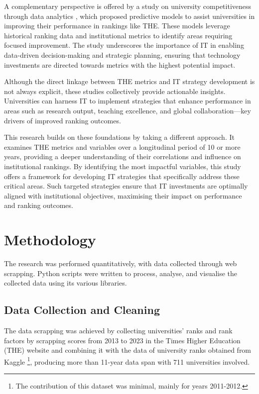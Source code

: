 \documentclass[sigconf]{acmart}
\begin{document}
A complementary perspective is offered by a study on university competitiveness through data analytics \cite{analytics2022competitiveness}, which proposed predictive models to assist universities in improving their performance in rankings like THE. These models leverage historical ranking data and institutional metrics to identify areas requiring focused improvement. The study underscores the importance of IT in enabling data-driven decision-making and strategic planning, ensuring that technology investments are directed towards metrics with the highest potential impact.

Although the direct linkage between THE metrics and IT strategy development is not always explicit, these studies collectively provide actionable insights. Universities can harness IT to implement strategies that enhance performance in areas such as research output, teaching excellence, and global collaboration—key drivers of improved ranking outcomes.

This research builds on these foundations by taking a different approach. It examines THE metrics and variables over a longitudinal period of 10 or more years, providing a deeper understanding of their correlations and influence on institutional rankings. By identifying the most impactful variables, this study offers a framework for developing IT strategies that specifically address these critical areas. Such targeted strategies ensure that IT investments are optimally aligned with institutional objectives, maximising their impact on performance and ranking outcomes.


\section{Methodology}
\label{sec:methodology}

The research was performed quantitatively, with data collected through web scrapping. Python scripts were written to process, analyse, and visualise the collected data using its various libraries. 

\subsection{Data Collection and Cleaning}

The data scrapping was achieved by collecting universities' ranks and rank factors by scrapping scores from 2013 to 2023 in the Times Higher Education (THE) website \cite{the2024} and combining it with the data of university ranks obtained from Kaggle \cite{ONeil_2020}\footnote{The contribution of this dataset was minimal, mainly for years 2011-2012.}, producing more than 11-year data span with 711 universities involved. 
\end{document}
